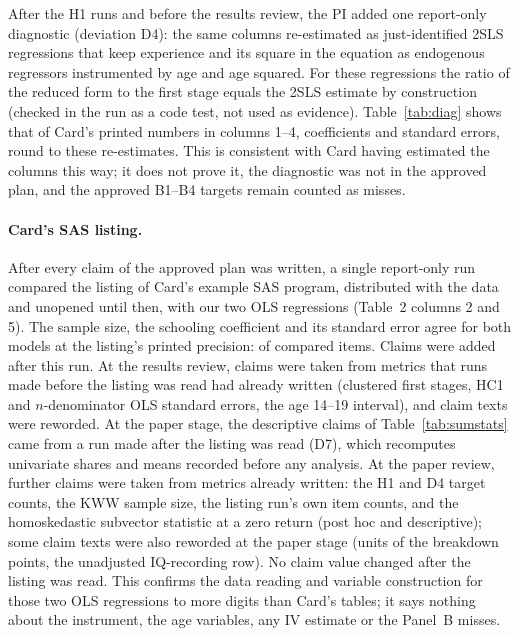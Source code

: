 \documentclass[11pt]{article}
\begin{document}
After the H1 runs and before the results review, the PI added one report-only diagnostic
(deviation D4): the same columns re-estimated as just-identified 2SLS regressions that keep
experience and its square in the equation as endogenous regressors instrumented by age and
age squared. For these regressions the ratio of the reduced form to the first stage equals
the 2SLS estimate by construction (checked in the run as a code test, not used as evidence).
Table~\ref{tab:diag} shows that \DiagTargetsReproduced{} of Card's \DiagTargets{} printed numbers in
columns 1--4, coefficients and standard errors, round to these re-estimates. This is
consistent with Card having estimated the columns this way; it does not prove it, the
diagnostic was not in the approved plan, and the approved B1--B4 targets remain counted as
misses.

\paragraph{Card's SAS listing.} After every claim of the approved plan was written, a
single report-only run compared the listing of Card's example SAS program, distributed with
the data and unopened until then, with our two OLS regressions (Table~2 columns 2 and 5).
The sample size, the schooling coefficient and its standard error agree for both models at
the listing's printed precision: \SasItemsMatched{} of \SasItems{} compared items. Claims
were added after this run. At the results review, claims were taken from metrics that runs
made before the listing was read had already written (clustered first stages, HC1 and
$n$-denominator OLS standard errors, the age 14--19 interval), and claim texts were
reworded. At the paper stage, the descriptive claims of Table~\ref{tab:sumstats} came from
a run made after the listing was read (D7), which recomputes univariate shares and means
recorded before any analysis. At the paper review, further claims were taken from metrics
already written: the H1 and D4 target counts, the KWW sample size, the listing run's own
item counts, and the homoskedastic subvector statistic at a zero return (post hoc and
descriptive); some claim texts were also reworded at the paper stage (units of the
breakdown points, the unadjusted IQ-recording row). No claim value changed after the
listing was read. This confirms the data reading and
variable construction for those two OLS regressions to more digits than Card's tables; it
says nothing about the instrument, the age variables, any IV estimate or the Panel~B misses.
\end{document}
